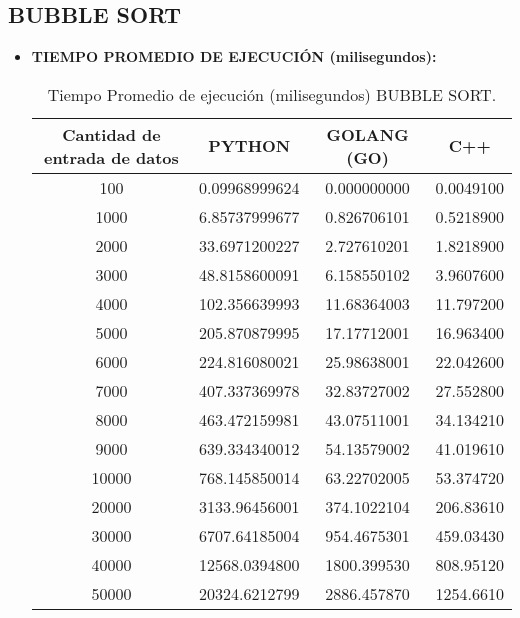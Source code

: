 \documentclass{article}
\begin{document}
\subsection{BUBBLE SORT}
    \begin{itemize}
      \item \textbf{TIEMPO PROMEDIO DE EJECUCIÓN (milisegundos):}
        \begin{table}[H]
            \centering
            \begin{tabular}{||c c c c||} 
              \hline
              \textbf{Cantidad de entrada de datos} & \textbf{PYTHON} & \textbf{GOLANG (GO)} & \textbf{C++} \\ [0.5ex] 
              \hline\hline
              100    &  0.09968999624  &  0.000000000  &  0.0049100  \\ [0.5ex]
              1000   &  6.85737999677  &  0.826706101  &  0.5218900  \\ [0.5ex]
              2000   &  33.6971200227  &  2.727610201  &  1.8218900  \\ [0.5ex]
              3000   &  48.8158600091  &  6.158550102  &  3.9607600  \\ [0.5ex]
              4000   &  102.356639993  &  11.68364003  &  11.797200  \\ [0.5ex]
              5000   &  205.870879995  &  17.17712001  &  16.963400  \\ [0.5ex]
              6000   &  224.816080021  &  25.98638001  &  22.042600  \\ [0.5ex]
              7000   &  407.337369978  &  32.83727002  &  27.552800  \\ [0.5ex]
              8000   &  463.472159981  &  43.07511001  &  34.134210  \\ [0.5ex]
              9000   &  639.334340012  &  54.13579002  &  41.019610  \\ [0.5ex]
              10000  &  768.145850014  &  63.22702005  &  53.374720  \\ [0.5ex]
              20000  &  3133.96456001  &  374.1022104  &  206.83610  \\ [0.5ex]
              30000  &  6707.64185004  &  954.4675301  &  459.03430  \\ [0.5ex]
              40000  &  12568.0394800  &  1800.399530  &  808.95120  \\ [0.5ex]
              50000  &  20324.6212799  &  2886.457870  &  1254.6610  \\ [0.5ex]
              \hline
            \end{tabular}
            \caption{Tiempo Promedio de ejecución (milisegundos) BUBBLE SORT.}
            \label{table:tiempoPromedioBubbleSort}
        \end{table}


\end{itemize}
\end{document}
